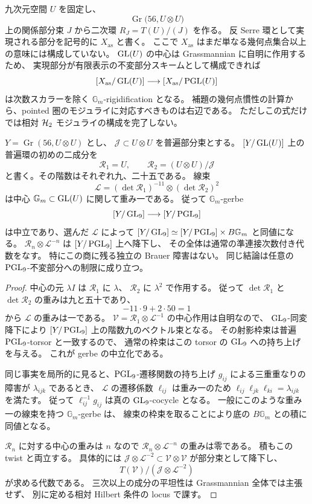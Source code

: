 九次元空間 $U$ を固定し、
\[
 \operatorname{Gr}\bigl(56,U\otimes U\bigr)
\]
上の関係部分束 $J$ から二次環 $R_J=T(U)/(J)$ を作る。
反 Serre 環として実現される部分を記号的に $X_{\mathrm{as}}$ と書く。
ここで $X_{\mathrm{as}}$ はまだ単なる幾何点集合以上の意味には構成していない。
$\operatorname{GL}(U)$ の中心は Grassmannian に自明に作用するため、
実現部分が有限表示の不変部分スキームとして構成できれば
\[
 [X_{\mathrm{as}}/\operatorname{GL}(U)]\longrightarrow
 [X_{\mathrm{as}}/\operatorname{PGL}(U)]
\]
は次数スカラーを除く $\mathbb G_m$-rigidification となる。
補題の幾何点慣性の計算から、pointed 圏のモジュライに対応すべきものは右辺である。
ただしこの式だけでは相対 $\mathcal H_2$ モジュライの構成を完了しない。

\begin{proposition}
\label{prop:antiserre-gerbe-neutral}
$Y=\operatorname{Gr}(56,U\otimes U)$ とし、
$\mathcal J\subset U\otimes U$ を普遍部分束とする。
$[Y/\operatorname{GL}(U)]$ 上の普遍環の初めの二成分を
\[
 \mathcal R_1=U,\qquad
 \mathcal R_2=(U\otimes U)/\mathcal J
\]
と書く。その階数はそれぞれ九、二十五である。
線束
\[
 \mathcal L=(\det\mathcal R_1)^{-11}
                 \otimes(\det\mathcal R_2)^2
\]
は中心 $\mathbb G_m\subset\operatorname{GL}(U)$ に関して重み一である。
従って $\mathbb G_m$-gerbe
\[
 [Y/\operatorname{GL}_9]\longrightarrow[Y/\operatorname{PGL}_9]
\]
は中立であり、選んだ $\mathcal L$ によって
$[Y/\operatorname{GL}_9]\simeq[Y/\operatorname{PGL}_9]\times B\mathbb G_m$ と同値になる。
$\mathcal R_n\otimes\mathcal L^{-n}$ は $[Y/\operatorname{PGL}_9]$ 上へ降下し、
その全体は通常の準連接次数付き代数をなす。
特にこの商に残る独立の Brauer 障害はない。
同じ結論は任意の $\operatorname{PGL}_9$-不変部分への制限に成り立つ。
\end{proposition}

\begin{proof}
中心の元 $\lambda I$ は $\mathcal R_1$ に $\lambda$、
$\mathcal R_2$ に $\lambda^2$ で作用する。
従って $\det\mathcal R_1$ と $\det\mathcal R_2$ の重みは九と五十であり、
\[
 -11\cdot9+2\cdot50=1
\]
から $\mathcal L$ の重みは一である。
$\mathcal V=\mathcal R_1\otimes\mathcal L^{-1}$ の中心作用は自明なので、
$\operatorname{GL}_9$-同変降下により $[Y/\operatorname{PGL}_9]$ 上の階数九のベクトル束となる。
その射影枠束は普遍 $\operatorname{PGL}_9$-torsor と一致するので、
通常の枠束はこの torsor の $\operatorname{GL}_9$ への持ち上げを与える。
これが gerbe の中立化である。

同じ事実を局所的に見ると、$\operatorname{PGL}_9$-遷移関数の持ち上げ
$g_{ij}$ による三重重なりの障害が $\lambda_{ijk}$ であるとき、
$\mathcal L$ の遷移係数 $\ell_{ij}$ は重み一のため
$\ell_{ij}\ell_{jk}\ell_{ki}=\lambda_{ijk}$ を満たす。
従って $\ell_{ij}^{-1}g_{ij}$ は真の $\operatorname{GL}_9$-cocycle となる。
一般にこのような重み一の線束を持つ $\mathbb G_m$-gerbe は、
線束の枠束を取ることにより底の $B\mathbb G_m$ との積に同値となる。

$\mathcal R_n$ に対する中心の重みは $n$ なので
$\mathcal R_n\otimes\mathcal L^{-n}$ の重みは零である。
積もこの twist と両立する。
具体的には $\mathcal J\otimes\mathcal L^{-2}\subset
\mathcal V\otimes\mathcal V$ が部分束として降下し、
\[
 T(\mathcal V)/(\mathcal J\otimes\mathcal L^{-2})
\]
が求める代数である。
三次以上の成分の平坦性は Grassmannian 全体では主張せず、
別に定める相対 Hilbert 条件の locus で課す。
\end{proof}


